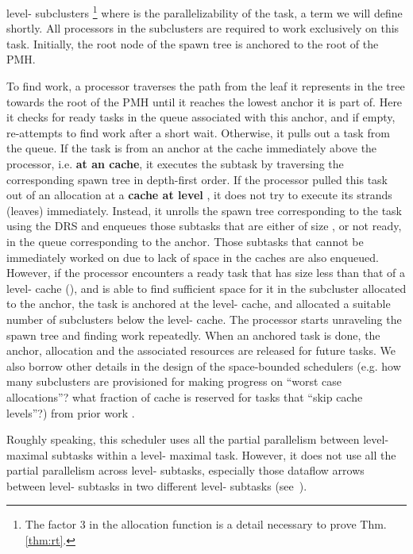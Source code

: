 level- subclusters \footnote{The factor 3 in the allocation
function is a detail necessary to prove Thm.\ref{thm:rt}.}
where  is the parallelizability
of the task, a term we will define shortly. All processors in the
subclusters are required to work exclusively on this task.  Initially, 
the root node of the spawn tree is anchored to the root of the PMH.

To find work, a processor traverses the path from the leaf it
represents in the tree towards the root of the PMH until it reaches
the lowest anchor it is part of. Here it checks for ready tasks in the
queue associated with this anchor, and if empty, re-attempts to find
work after a short wait.  Otherwise, it pulls out a task from the
queue.  If the task is from an anchor at the cache immediately above
the processor, i.e. {\bf at an  cache}, it executes the subtask
by traversing the corresponding spawn tree in depth-first order.  If
the processor pulled this task out of an allocation at a {\bf cache at
level }, it does not try to execute its strands (leaves)
immediately. Instead, it unrolls the spawn tree corresponding to the
task using the DRS and enqueues those subtasks that are either of size
, or not ready, in the queue corresponding to the
anchor. Those subtasks that cannot be immediately worked on due to
lack of space in the caches are also enqueued. However, if the
processor encounters a ready task that has size less than that of a
level- cache (), and is able to find sufficient space for it
in the subcluster allocated to the anchor, the task is anchored at the
level- cache, and allocated a suitable number of subclusters below
the level- cache.  The processor starts unraveling the spawn tree
and finding work repeatedly.  When an anchored task is done, the
anchor, allocation and the associated resources are released for
future tasks. We also borrow other details in the design of the
space-bounded schedulers (e.g. how many subclusters are provisioned
for making progress on ``worst case allocations''? what fraction of
cache is reserved for tasks that ``skip cache levels''?)  from prior
work \cite{BlellochFiGi11}.

Roughly speaking, this scheduler uses all the partial parallelism
between level- maximal subtasks within a level- maximal
task. However, it does not use all the partial parallelism across
level- subtasks, especially those dataflow arrows between
level- subtasks in two different level- subtasks
(see~).

